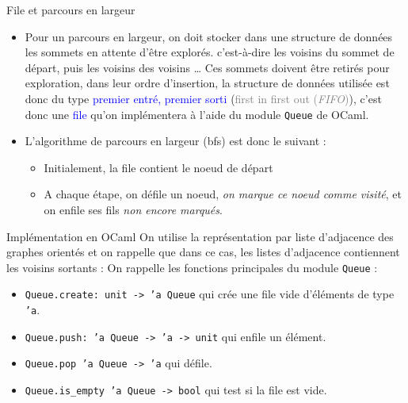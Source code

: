 \documentclass[10pt]{beamer}
\begin{document}
\begin{frame}[fragile]{\Ctitle}{\stitle}
	\begin{block}{File et parcours en largeur}
		\begin{itemize}
			\item<1-> Pour un parcours en largeur, on doit stocker dans une structure de données les sommets en attente d'être explorés. c'est-à-dire les voisins du sommet de départ, puis les voisins des voisins \dots
				Ces sommets doivent être retirés pour exploration, dans leur ordre d'insertion, la structure de données utilisée est donc du type \textcolor{blue}{premier entré, premier sorti} (\textcolor{gray}{first in first out (\textit{FIFO})}), c'est donc une \textcolor{blue}{file} qu'on implémentera à l'aide du module \texttt{Queue} de OCaml.
			\item<2-> L'algorithme de parcours en largeur ({\sc bfs}) est donc le suivant :
				\begin{itemize}
					\item<3-> Initialement, la file contient le noeud de départ
					\item<4-> A chaque étape, on défile un noeud, \textit{on marque ce noeud comme visité}, et on enfile ses fils \textit{non encore marqués}.
				\end{itemize}
		\end{itemize}
	\end{block}
\end{frame}

\begin{frame}[fragile]{\Ctitle}{\stitle}
	\begin{block}{Implémentation en OCaml}
		On utilise la représentation par liste d'adjacence des graphes orientés et on rappelle que dans ce cas, les listes d'adjacence contiennent les voisins \textcolor{BrickRed}{sortants} :
		On rappelle les fonctions principales du module \texttt{Queue} :
		\begin{itemize}
			\item \texttt{Queue.create: unit -> 'a Queue}  qui crée une file vide d'éléments de type {\tt 'a}.
			\item \texttt{Queue.push: 'a Queue -> 'a -> unit}  qui enfile un élément.
			\item \texttt{Queue.pop 'a Queue -> 'a} qui défile.
			\item \texttt{Queue.is_empty 'a Queue -> bool} qui test si la file est vide.
		\end{itemize}
	\end{block}
\end{frame}
\end{document}
